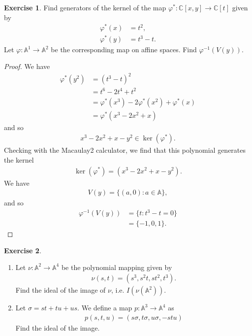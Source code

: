 \documentclass[12pt]{extarticle}
\newcommand{\set}[1]{\{#1\}}
\newcommand{\C}{\mathbb{C}}
\newcommand{\<}{\langle}
\renewcommand{\>}{\rangle}
\theoremstyle{definition}
\newtheorem{exercise}{Exercise}
\begin{document}
\begin{exercise}
  Find generators of the kernel of the map $\varphi^*: \C[x,y] \to \C[t]$ given by
  \begin{align*}
    \varphi^*(x) &= t^2, \\
    \varphi^*(y) &= t^3-t.
  \end{align*}
  Let $\varphi: \mathbb{A}^1 \to \mathbb{A}^2$ be the corresponding map on affine spaces. Find $\varphi^{-1}(V(y))$.
\end{exercise}
\begin{proof}
  We have
  \begin{align*}
    \varphi^*(y^2) 
    &= (t^3-t)^2 \\
    &= t^6 - 2t^4 + t^2 \\
    &= \varphi^*(x^3) -  2\varphi^*(x^2) + \varphi^*(x) \\
    &= \varphi^*(x^3 - 2x^2 + x)
  \end{align*}
  and so
  \begin{align*}
    x^3 - 2x^2 + x - y^2  \in \ker(\varphi^*).
  \end{align*}
  Checking with the Macaulay2 calculator, we find that this polynomial generates the kernel
  \begin{align*}
    \ker(\varphi^*) = (x^3 - 2x^2 + x - y^2).
  \end{align*}
  We have
  \begin{align*}
    V(y) = \set{(a,0) : a \in \mathbb{A}},
  \end{align*}
  and so
  \begin{align*}
    \varphi^{-1}(V(y))
    &= \set{t : t^3-t = 0} \\
    &
    = \set{-1,0,1}.
  \end{align*}
\end{proof}
\begin{exercise}
  \begin{enumerate}
  \item
    Let $\nu: \mathbb{A}^2 \to \mathbb{A}^4$ be the polynomial mapping given by
    \begin{align*}
      \nu(s,t) = (s^3, s^2t, st^2, t^3).
    \end{align*}
    Find the ideal of the image of $\nu$, i.e. $I(\nu(\mathbb{A}^2))$.
  \item
    Let $\sigma = st + tu + us.$ We define a map $p: \mathbb{A}^3 \to \mathbb{A}^4$ as
    \begin{align*}
      p(s,t,u)=(s\sigma, t\sigma, u\sigma, -stu)
    \end{align*}
    Find the ideal of the image.
  \end{enumerate}
\end{exercise}
\end{document}
